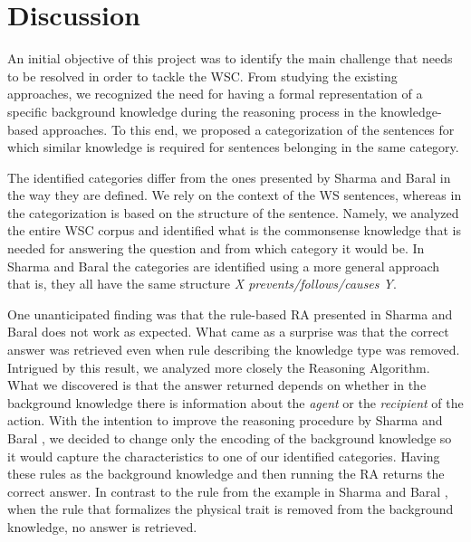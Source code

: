 \section{Discussion}
\label{section:Discussion}


An initial objective of this project was to identify the main challenge that needs to be resolved in order to tackle the WSC. From studying the existing approaches, we recognized the need for having a formal representation of a specific background knowledge during the reasoning process in the knowledge-based approaches. To this end, we proposed a categorization of the sentences for which similar knowledge is required for sentences belonging in the same category.

The identified categories differ from the ones presented by Sharma and Baral \cite{2018CommonsenseKT} in the way they are defined. We rely on the context of the WS sentences, whereas in \cite{2018CommonsenseKT} the categorization is based on the structure of the sentence. Namely, we analyzed the entire WSC corpus and identified what is the commonsense knowledge that is needed for answering the question and from which category it would be. In Sharma and Baral \cite{2018CommonsenseKT} the categories are identified using a more general approach that is, they all have the same structure \textit{X prevents/follows/causes Y}. 

One unanticipated finding was that the rule-based RA presented in Sharma and Baral \cite{2018CommonsenseKT} does not work as expected. What came as a surprise was that the correct answer was retrieved even when rule describing the knowledge type was removed. Intrigued by this result, we analyzed more closely the Reasoning Algorithm. What we discovered is that the answer returned depends on whether in the background knowledge there is information about the \textit{agent} or the \textit{recipient} of the action. With the intention to improve the reasoning procedure by  Sharma and Baral \cite{2018CommonsenseKT}, we decided to change only the encoding of the background knowledge so it would capture the characteristics to one of our identified categories. Having these rules as the background knowledge and then running the RA returns the correct answer. In contrast to the rule from the example in Sharma and Baral \cite{2018CommonsenseKT}, when the rule that formalizes the physical trait is removed from the background knowledge, no answer is retrieved. 

